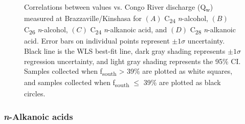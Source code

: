 \begin{figure}[p]
	\caption[Correlations between  and discharge]{Correlations between  values vs. Congo River discharge (Q\textsubscript{w}) measured at Brazzaville/Kinshasa for $(A)$ C\textsubscript{24} \textit{n}-alcohol, $(B)$ C\textsubscript{26} \textit{n}-alcohol, $(C)$ C\textsubscript{24} \textit{n}-alkanoic acid, and $(D)$ C\textsubscript{28} \textit{n}-alkanoic acid. Error bars on individual points represent $\pm 1 \sigma$ uncertainty. Black line is the WLS best-fit line, dark gray shading represents $\pm 1 \sigma$ regression uncertainty, and light gray shading represents the 95\% CI. Samples collected when f\textsubscript{south} > 39\% are plotted as white squares, and samples collected when f\textsubscript{south} $\leq$ 39\% are plotted as black circles.}
	\label{Ch4Fig:8} 
\end{figure}

\subsubsection{\textit{n}-Alkanoic acids}

